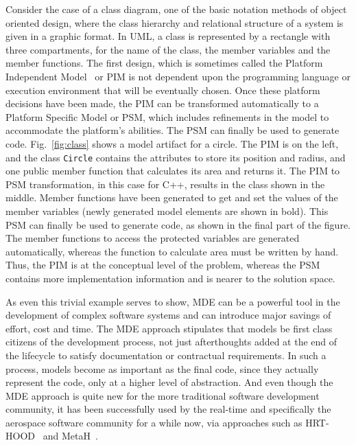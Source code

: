 Consider the case of a class diagram, one of the basic notation
methods of object oriented design, where the class hierarchy and
relational structure of a system is given in a graphic format. In UML,
a class is represented by a rectangle with three compartments, for the
name of the class, the member variables and the member functions. The
first design, which is sometimes called the Platform Independent
Model~\cite{mda-guide} or PIM is not dependent upon the programming
language or execution environment that will be eventually chosen. Once
these platform decisions have been made, the PIM can be transformed
automatically to a Platform Specific Model or PSM, which includes
refinements in the model to accommodate the platform's abilities. The
PSM can finally be used to generate code. Fig.~\ref{fig:class} shows a
model artifact for a circle. The PIM is on the left, and the class
\texttt{Circle} contains the attributes to store its position and
radius, and one public member function that calculates its area and
returns it. The PIM to PSM transformation, in this case for C++,
results in the class shown in the middle. Member functions have been
generated to get and set the values of the member variables (newly
generated model elements are shown in bold). This PSM can finally be
used to generate code, as shown in the final part of the figure. The
member functions to access the protected variables are generated
automatically, whereas the function to calculate area must be written
by hand. Thus, the PIM is at the conceptual level of the problem,
whereas the PSM contains more implementation information and is nearer
to the solution space.

As even this trivial example serves to show, MDE can be a powerful
tool in the development of complex software systems and can introduce
major savings of effort, cost and time. The MDE approach stipulates
that models be first class citizens of the development process, not
just afterthoughts added at the end of the lifecycle to satisfy
documentation or contractual requirements. In such a process, models
become as important as the final code, since they actually represent
the code, only at a higher level of abstraction. And even though the
MDE approach is quite new for the more traditional software
development community, it has been successfully used by the real-time
and specifically the aerospace software community for a while now, via
approaches such as HRT-HOOD~\cite{burns@rts94} and
MetaH~\cite{metah-manual}.

